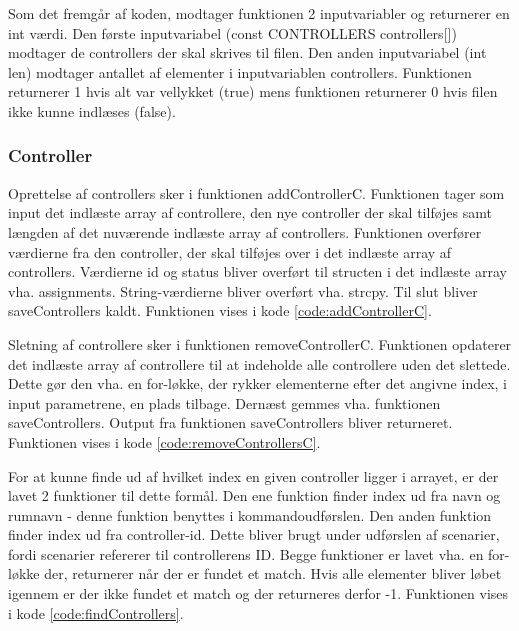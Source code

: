 
Som det fremgår af koden, modtager funktionen 2 inputvariabler og returnerer en int værdi. Den første inputvariabel (const CONTROLLERS controllers[]) modtager de controllers der skal skrives til filen. Den anden inputvariabel (int len) modtager antallet af elementer i inputvariablen controllers. Funktionen returnerer 1 hvis alt var vellykket (true) mens funktionen returnerer 0 hvis filen ikke kunne indlæses (false).

\subsubsection*{Controller}\label{sec:impl_controller}
Oprettelse af controllers sker i funktionen addControllerC. Funktionen tager som input det indlæste array af controllere, den nye controller der skal tilføjes samt længden af det nuværende indlæste array af controllers. Funktionen overfører værdierne fra den controller, der skal tilføjes over i det indlæste array af controllers. Værdierne id og status bliver overført til structen i det indlæste array vha. assignments. String-værdierne bliver overført vha. strcpy. Til slut bliver saveControllers kaldt. Funktionen vises i kode \ref{code:addControllerC}.


Sletning af controllere sker i funktionen removeControllerC. Funktionen opdaterer det indlæste array af controllere til at indeholde alle controllere uden det slettede. Dette gør den vha. en for-løkke, der rykker elementerne efter det angivne index, i input parametrene, en plads tilbage. Dernæst gemmes vha. funktionen saveControllers. Output fra funktionen saveControllers bliver returneret. Funktionen vises i kode \ref{code:removeControllersC}.


For at kunne finde ud af hvilket index en given controller ligger i arrayet, er der lavet 2 funktioner til dette formål. Den ene funktion finder index ud fra navn og rumnavn - denne funktion benyttes i kommandoudførslen. Den anden funktion finder index ud fra controller-id. Dette bliver brugt under udførslen af scenarier, fordi scenarier refererer til controllerens ID. Begge funktioner er lavet vha. en for-løkke der, returnerer når der er fundet et match. Hvis alle elementer bliver løbet igennem er der ikke fundet et match og der returneres derfor -1. Funktionen vises i kode \ref{code:findControllers}.


